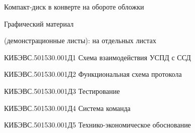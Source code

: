 


 
 
 
 
 \newpage
 \tableofcontents
 
 \noindent\hspace{7.5mm}Компакт-диск \hfill в конверте на обороте обложки
 
 \noindent\hspace{7.5mm}Графический материал
 
 \noindent\hspace{7.5mm}(демонстрационные листы): \hfill на отдельных листах
 
 \noindent\hspace{7.5mm}КИБЭВС.501530.001Д1 Схема взаимодействия УСПД с ССД
 
 \noindent\hspace{7.5mm}КИБЭВС.501530.001Д2 Функциональная схема протокола

 \noindent\hspace{7.5mm}КИБЭВС.501530.001Д3 Тестирование
 
 \noindent\hspace{7.5mm}КИБЭВС.501530.001Д4 Система команда 
 
 \noindent\hspace{7.5mm}КИБЭВС.501530.001Д5 Технико-экономическое обоснование
 
 
 
 
 
 
 \newpage
 \renewcommand{\refname}{\hfill Список использованных источников \hfill}
 
 
 
 


